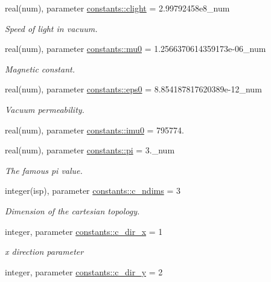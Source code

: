 \begin{DoxyCompactItemize}
real(num), parameter \hyperlink{namespaceconstants_ac23d8857383002cada2aa571fd859533}{constants\+::clight} = 2.\+99792458e8\+\_\+num
\begin{DoxyCompactList}\small\item\em Speed of light in vacuum. \end{DoxyCompactList}\item 
real(num), parameter \hyperlink{namespaceconstants_adf2453bfeefbefa1135a81f4ddfe4d6d}{constants\+::mu0} = 1.\+2566370614359173e-\/06\+\_\+num
\begin{DoxyCompactList}\small\item\em Magnetic constant. \end{DoxyCompactList}\item 
real(num), parameter \hyperlink{namespaceconstants_a4fc609b4d7bd5d8e45e57bd0ba7c5e29}{constants\+::eps0} = 8.\+854187817620389e-\/12\+\_\+num
\begin{DoxyCompactList}\small\item\em Vacuum permeability. \end{DoxyCompactList}\item 
real(num), parameter \hyperlink{namespaceconstants_abcf10ccefe6023e0401ce1b4a5f74fb5}{constants\+::imu0} = 795774.
\item 
real(num), parameter \hyperlink{namespaceconstants_a736c2860cb0585043ad4abcd1c3352b1}{constants\+::pi} = 3.\+\_\+num
\begin{DoxyCompactList}\small\item\em The famous pi value. \end{DoxyCompactList}\item 
integer(isp), parameter \hyperlink{namespaceconstants_aad8d45b739c41f2926fd2accb3de9dd2}{constants\+::c\+\_\+ndims} = 3
\begin{DoxyCompactList}\small\item\em Dimension of the cartesian topology. \end{DoxyCompactList}\item 
integer, parameter \hyperlink{namespaceconstants_a8e38e74e9723ce351e7a20787e649e89}{constants\+::c\+\_\+dir\+\_\+x} = 1
\begin{DoxyCompactList}\small\item\em x direction parameter \end{DoxyCompactList}\item 
integer, parameter \hyperlink{namespaceconstants_a5d84bc6ed2e3bd7b6e64704dc587825b}{constants\+::c\+\_\+dir\+\_\+y} = 2
\item 

\end{DoxyCompactItemize}
